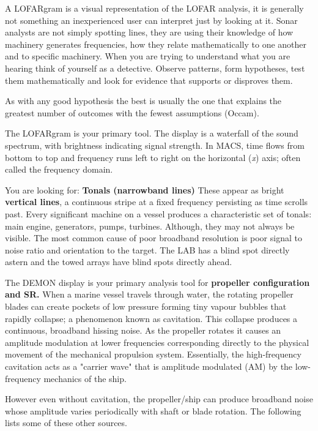 A LOFARgram is a visual representation of the LOFAR analysis, it is generally not something an inexperienced user can interpret just by looking at it. Sonar analysts are not simply spotting lines, they are using their knowledge of how machinery generates frequencies, how they relate mathematically to one another and to specific machinery. When you are trying to understand what you are hearing think of yourself as a detective. Observe patterns, form hypotheses, test them mathematically and look for evidence that supports or disproves them.

\begin{learnpoint}
    As with any good hypothesis the best is usually the one that explains the greatest number of outcomes with the fewest assumptions (Occam).
\end{learnpoint}

The LOFARgram is your primary tool. The display is a waterfall of the sound spectrum, with brightness indicating signal strength. In MACS, time flows from bottom to top and frequency runs left to right on the horizontal (\textit{x}) axis; often called the frequency domain.

You are looking for: \textbf{Tonals (narrowband lines)} These appear as bright \textbf{vertical lines}, a continuous stripe at a fixed frequency persisting as time scrolls past. Every significant machine on a vessel produces a characteristic set of tonals: main engine, generators, pumps, turbines. Although, they may not always be visible. The most common cause of poor broadband resolution is poor signal to noise ratio and orientation to the target. The LAB has a blind spot directly astern and the towed arrays have blind spots directly ahead.

The DEMON display is your primary analysis tool for \textbf{propeller configuration and SR.} When a marine vessel travels through water, the rotating propeller blades can create pockets of low pressure forming tiny vapour bubbles that rapidly collapse; a phenomenon known as cavitation. This collapse produces a continuous, broadband hissing noise. As the propeller rotates it causes an amplitude modulation at lower frequencies corresponding directly to the physical movement of the mechanical propulsion system. Essentially, the high-frequency cavitation acts as a "carrier wave" that is amplitude modulated (AM) by the low-frequency mechanics of the ship.

However even without cavitation, the propeller/ship can produce broadband noise whose amplitude varies periodically with shaft or blade rotation. The following lists some of these other sources.

